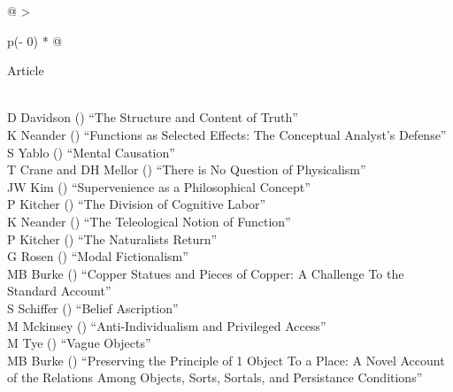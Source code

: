 \documentclass[
  10pt,
  letterpaper,
  DIV=11,
  numbers=noendperiod,
  twoside]{scrartcl}
\begin{document}
\begin{longtable}[]{@{}
  >{\raggedright\arraybackslash}p{(\columnwidth - 0\tabcolsep) * }@{}}

\caption{\label{tbl-early-1990s}The twenty articles from 1990-1994 most
widely cited at the time.}

\tabularnewline

\toprule\noalign{}
\begin{minipage}[b]{\linewidth}\raggedright
Article
\end{minipage} \\
\midrule\noalign{}
\endhead
\bottomrule\noalign{}
\endlastfoot
D Davidson
()
``The Structure and Content of Truth'' \\
K Neander
()
``Functions as Selected Effects: The Conceptual Analyst's Defense'' \\
S Yablo
()
``Mental Causation'' \\
T Crane and DH Mellor
()
``There is No Question of Physicalism'' \\
JW Kim
()
``Supervenience as a Philosophical Concept'' \\
P Kitcher
()
``The Division of Cognitive Labor'' \\
K Neander
()
``The Teleological Notion of Function'' \\
P Kitcher
()
``The Naturalists Return'' \\
G Rosen
()
``Modal Fictionalism'' \\
MB Burke
()
``Copper Statues and Pieces of Copper: A Challenge To the Standard
Account'' \\
S Schiffer
()
``Belief Ascription'' \\
M Mckinsey
()
``Anti-Individualism and Privileged Access'' \\
M Tye
()
``Vague Objects'' \\
MB Burke
()
``Preserving the Principle of 1 Object To a Place: A Novel Account of
the Relations Among Objects, Sorts, Sortals, and Persistance
Conditions'' \\

\end{longtable}
\end{document}
